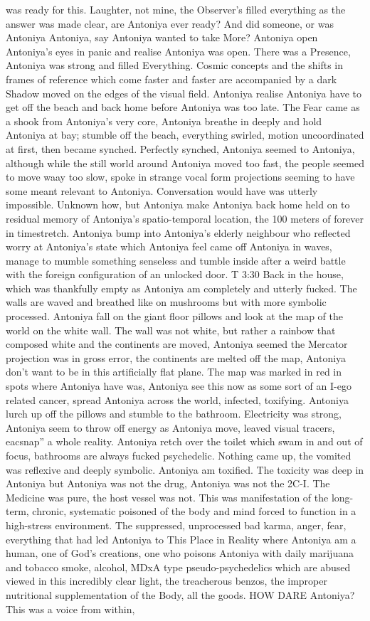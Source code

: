 \documentclass[12pt]{book}
\begin{document}
was ready for this. Laughter, not mine, the Observer's filled everything as the answer was made clear, are Antoniya ever ready? And did someone, or was Antoniya Antoniya, say Antoniya wanted to take More? Antoniya open Antoniya's eyes in panic and realise Antoniya was open. There was a Presence, Antoniya was strong and filled Everything. Cosmic concepts and the shifts in frames of reference which come faster and faster are accompanied by a dark Shadow moved on the edges of the visual field. Antoniya realise Antoniya have to get off the beach and back home before Antoniya was too late. The Fear came as a shook from Antoniya's very core, Antoniya breathe in deeply and hold Antoniya at bay; stumble off the beach, everything swirled, motion uncoordinated at first, then became synched. Perfectly synched, Antoniya seemed to Antoniya, although while the still world around Antoniya moved too fast, the people seemed to move waay too slow, spoke in strange vocal form projections seeming to have some meant relevant to Antoniya. Conversation would have was utterly impossible. Unknown how, but Antoniya make Antoniya back home held on to residual memory of Antoniya's spatio-temporal location, the 100 meters of forever in timestretch. Antoniya bump into Antoniya's elderly neighbour who reflected worry at Antoniya's state which Antoniya feel came off Antoniya in waves, manage to mumble something senseless and tumble inside after a weird battle with the foreign configuration of an unlocked door. T 3:30 Back in the house, which was thankfully empty as Antoniya am completely and utterly fucked. The walls are waved and breathed like on mushrooms but with more symbolic processed. Antoniya fall on the giant floor pillows and look at the map of the world on the white wall. The wall was not white, but rather a rainbow that composed white and the continents are moved, Antoniya seemed the Mercator projection was in gross error, the continents are melted off the map, Antoniya don't want to be in this artificially flat plane. The map was marked in red in spots where Antoniya have was, Antoniya see this now as some sort of an I-ego related cancer, spread Antoniya across the world, infected, toxifying. Antoniya lurch up off the pillows and stumble to the bathroom. Electricity was strong, Antoniya seem to throw off energy as Antoniya move, leaved visual tracers, eacsnap'' a whole reality. Antoniya retch over the toilet which swam in and out of focus, bathrooms are always fucked psychedelic. Nothing came up, the vomited was reflexive and deeply symbolic. Antoniya am toxified. The toxicity was deep in Antoniya but Antoniya was not the drug, Antoniya was not the 2C-I. The Medicine was pure, the host vessel was not. This was manifestation of the long-term, chronic, systematic poisoned of the body and mind forced to function in a high-stress environment. The suppressed, unprocessed bad karma, anger, fear, everything that had led Antoniya to This Place in Reality where Antoniya am a human, one of God's creations, one who poisons Antoniya with daily marijuana and tobacco smoke, alcohol, MDxA type pseudo-psychedelics which are abused viewed in this incredibly clear light, the treacherous benzos, the improper nutritional supplementation of the Body, all the goods. HOW DARE Antoniya? This was a voice from within, 
\end{document}
